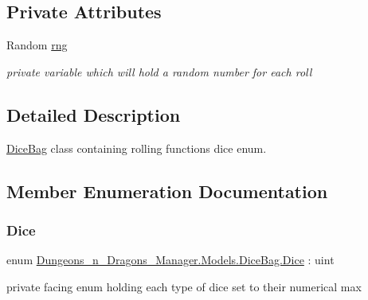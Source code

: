 \subsection*{Private Attributes}
\begin{DoxyCompactItemize}
\item 
Random \mbox{\hyperlink{class_dungeons__n___dragons___manager_1_1_models_1_1_dice_bag_a5932c409a8287ea61641f20048b6c2d1}{rng}}
\begin{DoxyCompactList}\small\item\em private variable which will hold a random number for each roll \end{DoxyCompactList}\end{DoxyCompactItemize}


\subsection{Detailed Description}
\mbox{\hyperlink{class_dungeons__n___dragons___manager_1_1_models_1_1_dice_bag}{Dice\+Bag}} class containing rolling functions dice enum. 



\subsection{Member Enumeration Documentation}
\mbox{\label{class_dungeons__n___dragons___manager_1_1_models_1_1_dice_bag_a6217970288bbbf366900fb850594603a}} 
\subsubsection{\texorpdfstring{Dice}{Dice}}
{\footnotesize\ttfamily enum \mbox{\hyperlink{class_dungeons__n___dragons___manager_1_1_models_1_1_dice_bag_a6217970288bbbf366900fb850594603a}{Dungeons\+\_\+n\+\_\+\+Dragons\+\_\+\+Manager.\+Models.\+Dice\+Bag.\+Dice}} \+: uint\hspace{0.3cm}{\ttfamily [strong]}}



private facing enum holding each type of dice set to their numerical max 



